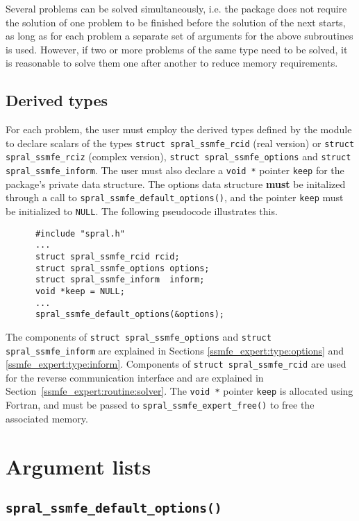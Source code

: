 Several problems can be solved simultaneously,
i.e. the package does not require the solution of
one problem to be finished before the solution of
the next starts, as long as for each problem a separate set
of arguments for the above subroutines is used.
However, if two or more problems of the same type
need to be solved, it is reasonable to solve them one
after another  to reduce  memory requirements.
\fi

\subsection{Derived types}
\label{derived types}

For each problem, the user must employ the derived types defined by the
module to declare scalars of the types 
{\tt struct spral\_ssmfe\_rcid} (real version) or 
{\tt struct spral\_ssmfe\_rciz} (complex version), 
{\tt struct spral\_ssmfe\_options} and 
{\tt struct spral\_ssmfe\_inform}. The user must also declare a \texttt{void *}
pointer \texttt{keep} for the package's private data structure. The options
data structure \textbf{must} be initalized through a call to \texttt{spral\_ssmfe\_default\_options()},
and the pointer \texttt{keep} must be initialized to \texttt{NULL}.
The following pseudocode illustrates this.
\begin{verbatim}
      #include "spral.h"
      ...
      struct spral_ssmfe_rcid rcid;
      struct spral_ssmfe_options options;
      struct spral_ssmfe_inform  inform;
      void *keep = NULL;
      ...
      spral_ssmfe_default_options(&options);
\end{verbatim}
The components of {\tt struct spral\_ssmfe\_options} and {\tt struct spral\_ssmfe\_inform} are explained
in Sections \ref{ssmfe_expert:type:options} and \ref{ssmfe_expert:type:inform}. Components
of \texttt{struct spral\_ssmfe\_rcid} are used for the reverse communication interface and
are explained in Section~\ref{ssmfe_expert:routine:solver}.
The \texttt{void~*} pointer \texttt{keep} is allocated using Fortran, and
must be passed to \texttt{spral\_ssmfe\_expert\_free()} to free the associated
memory.


\section{Argument lists}

\subsection{\texttt{spral\_ssmfe\_default\_options()}}

